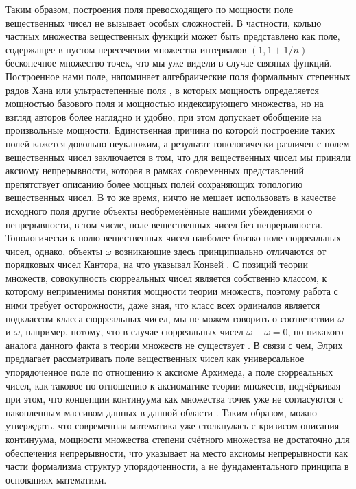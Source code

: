 \documentclass[12pt]{article}
\begin{document}
Таким образом, построения поля превосходящего по мощности поле вещественных чисел не вызывает особых сложностей. В частности, кольцо частных множества вещественных функций может быть представлено как поле, содержащее в пустом пересечении множества интервалов $(1, 1 + 1/n)$ бесконечное множество точек, что мы уже видели в случае связных функций. Построенное нами поле, напоминает алгебраические поля формальных степенных рядов Хана \cite{hahn-series} или ультрастепенные поля \cite{infinitesimal-fields}, в которых мощность определяется мощностью базового поля и мощностью индексирующего множества, но на взгляд авторов более наглядно и удобно, при этом допускает обобщение на произвольные мощности. Единственная причина по которой построение таких полей кажется довольно неуклюжим, а результат топологически различен с полем вещественных чисел заключается в том, что для вещественных чисел мы приняли аксиому непрерывности, которая в рамках современных представлений препятствует описанию более мощных полей сохраняющих топологию вещественных чисел. В то же время, ничто не мешает использовать в качестве исходного поля другие объекты необременённые нашими убеждениями о непрерывности, в том числе, поле вещественных чисел без непрерывности. Топологически к полю вещественных чисел наиболее близко поле сюрреальных чисел, однако, объекты $\dot{\omega}$ возникающие здесь принципиально отличаются от порядковых чисел Кантора, на что указывал Конвей \cite{conway-surreal-infinities}. С позиций теории множеств, совокупность сюрреальных чисел является собственно классом, к которому неприменимы понятия мощности теории множеств, поэтому работа с ними требует осторожности, даже зная, что класс всех ординалов является подклассом класса сюрреальных чисел, мы не можем говорить о соответствии $\dot{\omega}$ и $\omega$, например, потому, что в случае сюрреальных чисел $\dot{\omega} - \dot{\omega} = 0$, но никакого аналога данного факта в теории множеств не существует \cite{gonshor-surreal-ordinal}. В связи с чем, Элрих предлагает рассматривать поле вещественных чисел как универсальное упорядоченное поле по отношению к аксиоме Архимеда, а поле сюрреальных чисел, как таковое по отношению к аксиоматике теории множеств, подчёркивая при этом, что концепции континуума как множества точек уже не согласуются с накопленным массивом данных в данной области \cite{elrich}. Таким образом, можно утверждать, что современная математика уже столкнулась с кризисом описания континуума, мощности множества степени счётного множества не достаточно для обеспечения непрерывности, что указывает на место аксиомы непрерывности как части формализма структур упорядоченности, а не фундаментального принципа в основаниях математики. 
\end{document}
